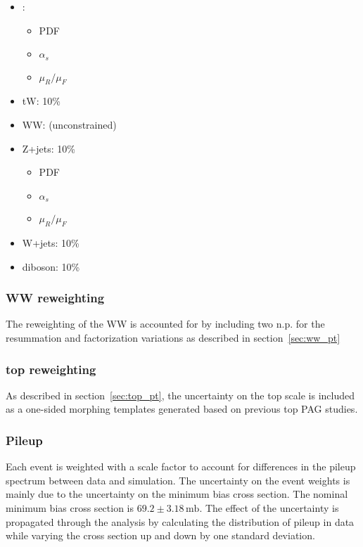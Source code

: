 \begin{itemize}
    \item \ttbar: 
    \begin{itemize}
        \item PDF
        \item $\alpha_{s}$
        \item $\mu_{R}/\mu_{F}$
    \end{itemize}
    \item tW: 10\%
    \item WW: (unconstrained)
    \item Z+jets: 10\%
    \begin{itemize}
        \item PDF
        \item $\alpha_{s}$
        \item $\mu_{R}/\mu_{F}$
    \end{itemize}
    \item W+jets: 10\%
    \item diboson: 10\%
\end{itemize}

\subsubsection{WW \pt reweighting}

The reweighting of the WW \pt is accounted for by including two n.p. for
the resummation and factorization variations as described in
section~\ref{sec:ww_pt}

\subsubsection{top \pt reweighting}

As described in section~\ref{sec:top_pt}, the uncertainty on the top \pt
scale is included as a one-sided morphing templates generated based on
previous top PAG studies.

\subsubsection{Pileup}

Each event is weighted with a scale factor to account for differences in
the pileup spectrum between data and simulation.  The uncertainty on
the event weights is mainly due to the uncertainty on the minimum bias
cross section.  The nominal minimum bias cross section is $69.2 \pm
3.18\,\text{mb}$. The effect of the uncertainty is propagated through the
analysis by calculating the distribution of pileup in data while varying
the cross section up and down by one standard deviation.  

